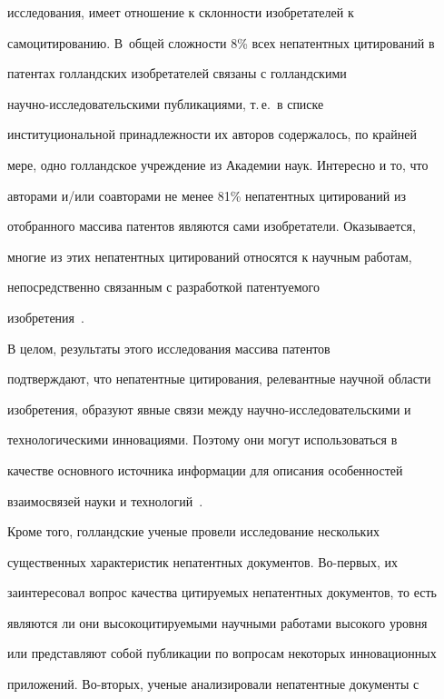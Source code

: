 исследования, имеет отношение к склонности изобретателей к 


самоцитированию. В~общей сложности 8\% всех непатентных цитирований в 


патентах голландских изобретателей связаны с голландскими 


     научно-исследовательскими публикациями, т.\,е.\ в списке 


институциональной принадлежности их авторов содержалось, по крайней 


мере, одно голландское учреждение из Академии наук. Интересно и то, что 


авторами и/или соавторами не менее 81\% непатентных цитирований из 


отобранного массива патентов являются сами изобретатели. Оказывается, 


многие из этих непатентных цитирований относятся к научным работам, 


непосредственно связанным с разработкой патентуемого 


изобретения~\cite{1-koz}.


     


     В целом, результаты этого исследования массива патентов 


подтверждают, что непатентные цитирования, релевантные научной области 


изобретения, образуют явные связи между научно-исследовательскими и 


технологическими инновациями. Поэтому они могут использоваться в 


качестве основного источника информации для описания особенностей 


взаимосвязей науки и технологий~\cite{1-koz, 4-koz, 9-koz}.


     


     Кроме того, голландские ученые провели исследование нескольких 


существенных характеристик непатентных документов. Во-пер\-вых, их 


заинтересовал вопрос качества цитируемых непатентных документов, то есть 


являются ли они высокоцитируемыми научными работами высокого уровня 


или представляют собой публикации по вопросам некоторых инновационных 


приложений. Во-вто\-рых, ученые анализировали непатентные документы с 


